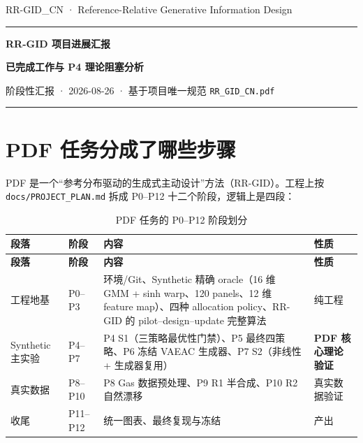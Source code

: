 \documentclass[11pt,a4paper]{ctexart}
\newcommand{\hcell}[1]{\textcolor{hlblue!85!black}{\bfseries #1}}
\begin{document}
\begin{center}
  {\color{pgray}\small RR-GID\_CN · Reference-Relative Generative Information Design}
  \par\vspace{0.8em}
  {\color{hlblue}\rule{0.94\textwidth}{1.4pt}}
  \par\vspace{1.1em}
  {\LARGE\bfseries\color{hlblue} RR-GID 项目进展汇报}\par\vspace{0.5em}
  {\large\bfseries 已完成工作与 P4 理论阻塞分析}\par\vspace{0.9em}
  {\color{pgray}\small 阶段性汇报 · 2026-08-26 · 基于项目唯一规范 \texttt{RR\_GID\_CN.pdf}}\par\vspace{0.6em}
  {\color{hlblue}\rule{0.94\textwidth}{1.4pt}}
\end{center}
\vspace{0.6em}

\section{PDF 任务分成了哪些步骤}
PDF 是一个“参考分布驱动的生成式主动设计”方法（RR-GID）。工程上按 \texttt{docs/PROJECT\_PLAN.md} 拆成 P0–P12 十二个阶段，逻辑上是四段：

\begin{longtable}{@{}C{2.1cm}C{1.9cm}L{8.6cm}C{2.4cm}@{}}
  \caption{PDF 任务的 P0–P12 阶段划分}\label{tbl:stages}\\
  \toprule[1.4pt]
  \hcell{段落} & \hcell{阶段} & \hcell{内容} & \hcell{性质} \\
  \midrule[0.8pt]
  \endfirsthead
  \toprule[1.4pt]
  \hcell{段落} & \hcell{阶段} & \hcell{内容} & \hcell{性质} \\
  \midrule[0.8pt]
  \endhead
  \bottomrule[1.4pt]
  \endfoot
  工程地基 & P0--P3 & 环境/Git、Synthetic 精确 oracle（16 维 GMM + sinh warp、120 panels、12 维 feature map）、四种 allocation policy、RR-GID 的 pilot--design--update 完整算法 & 纯工程 \\
   Synthetic 主实验 & P4--P7 & P4 S1（三策略最优性门禁）、P5 最终四策略、P6 冻结 VAEAC 生成器、P7 S2（非线性 + 生成器复用） & \textbf{PDF 核心理论验证} \\
  真实数据 & P8--P10 & P8 Gas 数据预处理、P9 R1 半合成、P10 R2 自然漂移 & 真实数据验证 \\
  收尾 & P11--P12 & 统一图表、最终复现与冻结 & 产出 \\
  \bottomrule[1.4pt]
\end{longtable}
\end{document}
